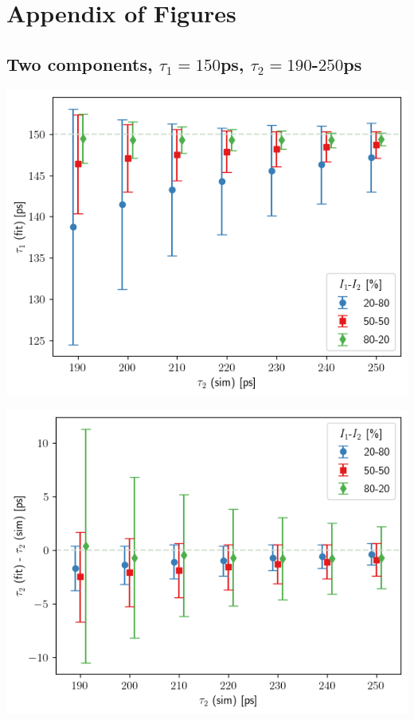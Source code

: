 \appendix

\chapter{Appendix of Figures} 

\pagebreak


\section{\boldmath Two components, $\tau_1 = 150$ps, $\tau_2=190$-$250$ps\unboldmath\label{t1-150}}

\begin{minipage}{ .47\linewidth}
    \includegraphics[width=\linewidth]{Batch 3/regular IRF/tau1 150/output/plotfin/t1.png}
    \label{fig:150-t1}
\end{minipage}
\hfill
\begin{minipage}{ .47\linewidth}
    \includegraphics[width=\linewidth]{Batch 3/regular IRF/tau1 150/output/plotfin/t2.png}
    \label{fig:150-t2}
\end{minipage}
